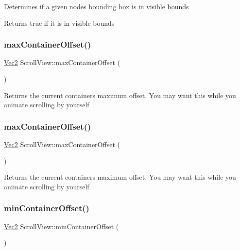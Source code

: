 Determines if a given node\textquotesingle{}s bounding box is in visible bounds

\begin{DoxyReturn}{Returns}
true if it is in visible bounds 
\end{DoxyReturn}
\mbox{\label{classScrollView_a0c3c4cc77fc7af466bfc3cccd6b1b122}} 
\subsubsection{\texorpdfstring{max\+Container\+Offset()}{maxContainerOffset()}\hspace{0.1cm}{\footnotesize\ttfamily [1/2]}}
{\footnotesize\ttfamily \hyperlink{classVec2}{Vec2} Scroll\+View\+::max\+Container\+Offset (\begin{DoxyParamCaption}{ }\end{DoxyParamCaption})}

Returns the current container\textquotesingle{}s maximum offset. You may want this while you animate scrolling by yourself \mbox{\label{classScrollView_a0c3c4cc77fc7af466bfc3cccd6b1b122}} 
\subsubsection{\texorpdfstring{max\+Container\+Offset()}{maxContainerOffset()}\hspace{0.1cm}{\footnotesize\ttfamily [2/2]}}
{\footnotesize\ttfamily \hyperlink{classVec2}{Vec2} Scroll\+View\+::max\+Container\+Offset (\begin{DoxyParamCaption}{ }\end{DoxyParamCaption})}

Returns the current container\textquotesingle{}s maximum offset. You may want this while you animate scrolling by yourself \mbox{\label{classScrollView_a53daf6cba39b0e1340d66728394c6a41}} 
\subsubsection{\texorpdfstring{min\+Container\+Offset()}{minContainerOffset()}\hspace{0.1cm}{\footnotesize\ttfamily [1/2]}}
{\footnotesize\ttfamily \hyperlink{classVec2}{Vec2} Scroll\+View\+::min\+Container\+Offset (\begin{DoxyParamCaption}{ }\end{DoxyParamCaption})}

